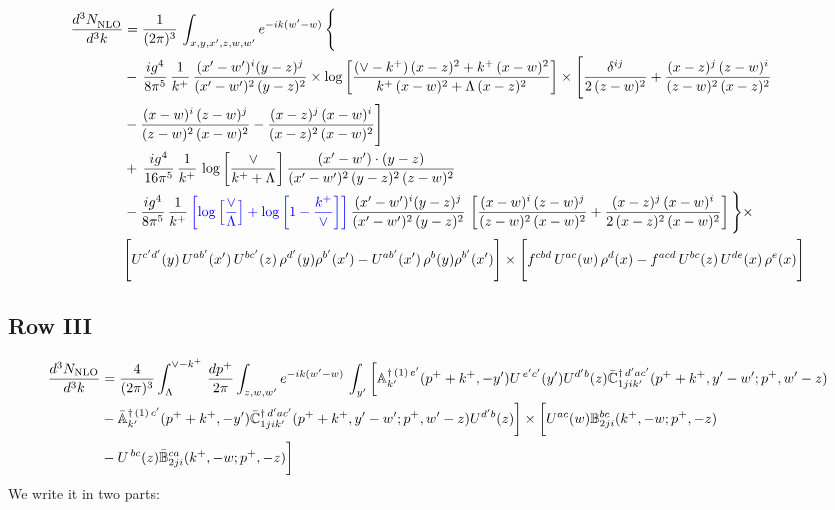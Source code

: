 \documentclass[9pt]{article}
\def\mf#1{\mathbb{#1}}
\numberwithin{equation}{section}
\begin{document}
\begin{align}
     \frac{d^{3}N_{\rm NLO}^{\rm}}{d^{3}k}  & =  \frac{1}{(2\pi)^{3}}\, \int_{x,y,x',z,w,w^{\prime}} e^{-ik(w^{\prime}-w)}\, \Bigg\{\notag \\ & -\,\frac{ig^{4}}{8\pi^{5}}\,\frac{1}{k^{+}}\,\frac{(x'-w')^{i}(y-z)^{j}}{(x'-w')^{2}\,(y-z)^{2}}\times \log{\left[\frac{(\vee-k^{+})\,(x-z)^{2}+k^{+}\,(x-w)^{2}}{k^{+}\,(x-w)^{2}+\Lambda\, (x-z)^{2}}\right]}\times \Bigg[\frac{\delta^{ij}}{2\,(z-w)^{2}}+\frac{(x-z)^{j}\,(z-w)^{i}}{(z-w)^{2}\,(x-z)^{2}}\notag \\ & -\frac{(x-w)^{i}\,(z-w)^{j}}{(z-w)^{2}\,(x-w)^{2}}-\frac{(x-z)^{j}\,(x-w)^{i}}{(x-z)^{2}\,(x-w)^{2}}\Bigg]\notag \\ & +\,\frac{ig^{4}}{16\pi^{5}}\,\frac{1}{k^{+}}\,\log{\left[\frac{\vee}{k^{+}+\Lambda}\right]}\, \frac{(x'-w')\cdot (y-z)}{(x'-w')^{2}\,(y-z)^{2}\,(z-w)^{2}}\notag \\ & -\frac{ig^{4}}{8\pi^{5}}\,\frac{1}{k^{+}}\,{\color{blue}\left[\log{\left[\frac{\vee}{\Lambda}\right]} + \log{\left[1-\frac{k^{+}}{\vee}\right]}\right]}\,\frac{(x'-w')^{i}(y-z)^{j}}{(x'-w')^{2}\,(y-z)^{2}}\,\left[\frac{(x-w)^{i}\,(z-w)^{j}}{(z-w)^{2}\,(x-w)^{2}}+\frac{(x-z)^{j}\,(x-w)^{i}}{2\,(x-z)^{2}\, (x-w)^{2}}\right]\Bigg\}\times \notag \\ & \Bigg[U^{c'd'}(y)\,U^{ab'}(x')\,U^{bc'}(z)\,\rho^{d'}(y)\rho^{b'}(x')-U^{ab'}(x')\,\rho^{b}(y)\rho^{b'}(x')\Bigg]\times\Bigg[f^{cbd}\,U^{ac}(w)\,\rho^{d}(x)-f^{acd}\, U^{bc}(z)\,U^{de}(x)\,\rho^{e}(x)\Bigg]
\end{align}
 \subsection{Row III\,}
 \begin{align}
    \frac{d^{3}N_{\rm NLO}}{d^{3}k} & =   \frac{4}{(2\pi)^{3}} \int_{\Lambda}^{\vee -k^{+}}\, \frac{dp^{+}}{2\pi}\int_{z,w,w^{\prime}} e^{-ik(w^{\prime}-w)}\,\int_{y^{\prime}}\bigg[\mf{A}^{\dagger\, (1)\,e^{\prime}}_{k^{\prime}}(p^{+}+k^{+},-y^{\prime})U^{\, e^{\prime}c^{\prime}}(y^{\prime})U^{d^{\prime}b}(z) \Bar{\mf{C}}^{\dagger\, d^{\prime}ac^{\prime}}_{1jik^{\prime}}(p^{+}+k^{+},y^{\prime}-w^{\prime}; p^{+},w^{\prime}-z)\notag \\ &  -\Bar{\mf{A}}^{\dagger\, (1)\,c^{\prime}}_{k^{\prime}}(p^{+}+k^{+},-y^{\prime}) \Bar{\mf{C}}^{\dagger\, d^{\prime}ac^{\prime}}_{1jik^{\prime}}(p^{+}+k^{+},y^{\prime}-w^{\prime}; p^{+},w^{\prime}-z)U^{d^{\prime}b}(z)\bigg] \times \bigg[U^{ac}(w) \mf{B}^{bc}_{2ji}(k^{+},-w;p^{+},-z)\notag \\ &  -U^{\, bc}(z)\Bar{\mf{B}}^{ca}_{2ji}(k^{+},-w; p^{+},-z)\bigg]\nonumber
\end{align}
We write it in two parts:
\end{document}
